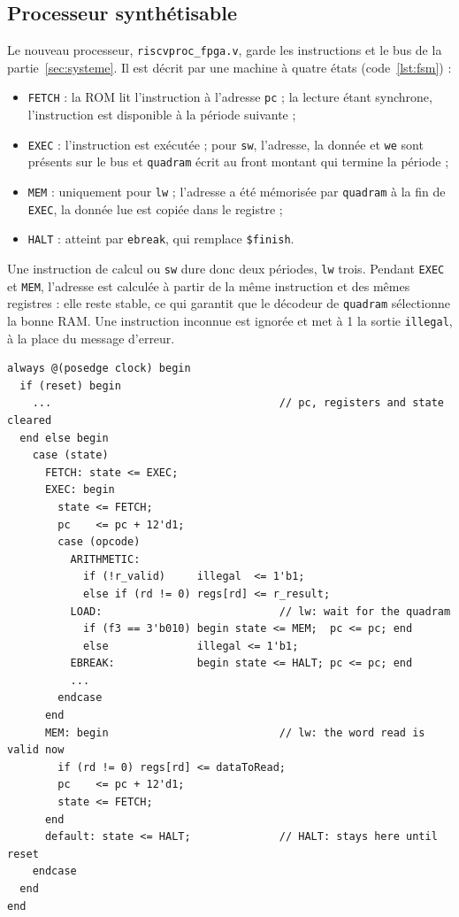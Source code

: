 \subsection{Processeur synthétisable}

Le nouveau processeur, \texttt{riscvproc\_fpga.v}, garde les instructions et le bus de la
partie~\ref{sec:systeme}. Il est décrit par une machine à quatre états
(code~\ref{lst:fsm}) :
\begin{itemize}
\item \texttt{FETCH} : la ROM lit l'instruction à l'adresse \texttt{pc} ; la lecture étant
synchrone, l'instruction est disponible à la période suivante ;
\item \texttt{EXEC} : l'instruction est exécutée ; pour \texttt{sw}, l'adresse, la donnée et
\texttt{we} sont présents sur le bus et \texttt{quadram} écrit au front montant qui termine
la période ;
\item \texttt{MEM} : uniquement pour \texttt{lw} ; l'adresse a été mémorisée par
\texttt{quadram} à la fin de \texttt{EXEC}, la donnée lue est copiée dans le registre ;
\item \texttt{HALT} : atteint par \texttt{ebreak}, qui remplace \texttt{\$finish}.
\end{itemize}
Une instruction de calcul ou \texttt{sw} dure donc deux périodes, \texttt{lw} trois. Pendant
\texttt{EXEC} et \texttt{MEM}, l'adresse est calculée à partir de la même instruction et des
mêmes registres : elle reste stable, ce qui garantit que le décodeur de \texttt{quadram}
sélectionne la bonne RAM. Une instruction inconnue est ignorée et met à 1 la sortie
\texttt{illegal}, à la place du message d'erreur.

\begin{lstlisting}[style=verilog, caption={Machine à états du processeur synthétisable (extrait)}, label={lst:fsm}]
always @(posedge clock) begin
  if (reset) begin
    ...                                    // pc, registers and state cleared
  end else begin
    case (state)
      FETCH: state <= EXEC;
      EXEC: begin
        state <= FETCH;
        pc    <= pc + 12'd1;
        case (opcode)
          ARITHMETIC:
            if (!r_valid)     illegal  <= 1'b1;
            else if (rd != 0) regs[rd] <= r_result;
          LOAD:                            // lw: wait for the quadram
            if (f3 == 3'b010) begin state <= MEM;  pc <= pc; end
            else              illegal <= 1'b1;
          EBREAK:             begin state <= HALT; pc <= pc; end
          ...
        endcase
      end
      MEM: begin                           // lw: the word read is valid now
        if (rd != 0) regs[rd] <= dataToRead;
        pc    <= pc + 12'd1;
        state <= FETCH;
      end
      default: state <= HALT;              // HALT: stays here until reset
    endcase
  end
end
\end{lstlisting}

